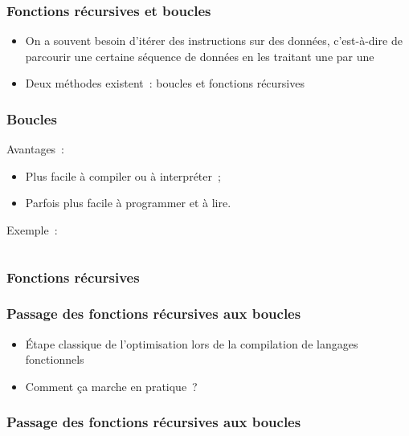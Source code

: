 

\begin{frame}
    \frametitle{Fonctions récursives et boucles}

    \begin{itemize}
        \item On a souvent besoin d’itérer des instructions sur des données,
            c’est-à-dire de parcourir une certaine séquence de données en les
            traitant une par une
        \pause
        \item Deux méthodes existent~: boucles et fonctions récursives
    \end{itemize}
\end{frame}

\begin{frame}
    \frametitle{Boucles}

    Avantages~:
    \pause
    \begin{itemize}
        \item Plus facile à compiler ou à interpréter~;
        \pause
        \item Parfois plus facile à programmer et à lire.
    \end{itemize}

    \pause
    Exemple~:
    \inputminted{ocaml}{exemples/0intro/somme_liste_boucle.ml}
\end{frame}

\begin{frame}
    \frametitle{Fonctions récursives}





\end{frame}


\begin{frame}
    \frametitle{Passage des fonctions récursives aux boucles}

    \begin{itemize}
        \pause
        \item Étape classique de l’optimisation lors de la compilation de
            langages fonctionnels
        \pause
        \item Comment ça marche en pratique~?
    \end{itemize}
\end{frame}


\begin{frame}
    \frametitle{Passage des fonctions récursives aux boucles}

    
\end{frame}

